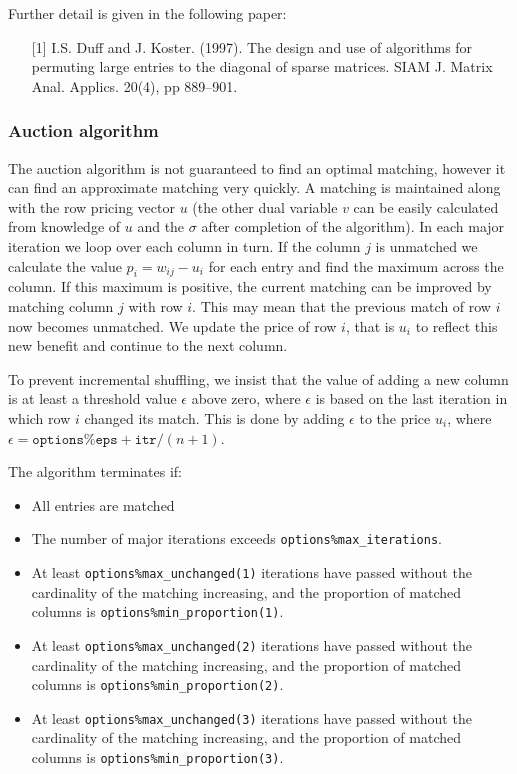 \noindent
Further detail is given in the following paper:
\begin{itemize}
   \item[{[1]}] I.S. Duff and J. Koster. (1997). The design and use of algorithms for permuting large entries to the diagonal of sparse matrices. SIAM J. Matrix Anal. Applics. 20(4), pp 889--901.
\end{itemize}

\subsubsection{Auction algorithm} \label{method:auction}
The auction algorithm is not guaranteed to find an optimal matching, however it
can find an approximate matching very quickly. A matching is maintained along
with the row pricing vector $u$ (the other dual variable $v$ can be easily
calculated from knowledge of $u$ and the $\sigma$ after completion of the
algorithm). In each major iteration we loop over each column in turn. If the
column $j$ is unmatched we calculate the value $p_i = w_{ij} - u_i$ for each
entry and find the maximum across the column. If this maximum is positive, the
current matching can be improved by matching column $j$ with row $i$. This may
mean that the previous match of row $i$ now becomes unmatched. We update the
price of row $i$, that is $u_i$ to reflect this new benefit and continue to the
next column.

To prevent incremental shuffling, we insist that the value of
adding a new column is at least a threshold value $\epsilon$ above zero, where
$\epsilon$ is based on the last iteration in which row $i$ changed its match.
This is done by adding $\epsilon$ to the price $u_i$, where $\epsilon = \texttt{options\%eps} + \texttt{itr} / (n+1)$.

The algorithm terminates if:
\begin{itemize}
   \item All entries are matched
   \item The number of major iterations exceeds \texttt{options\%max\_iterations}.
   \item At least \texttt{options\%max\_unchanged(1)} iterations have passed without the cardinality of the matching increasing, and the proportion of matched columns is \texttt{options\%min\_proportion(1)}.
   \item At least \texttt{options\%max\_unchanged(2)} iterations have passed without the cardinality of the matching increasing, and the proportion of matched columns is \texttt{options\%min\_proportion(2)}.
   \item At least \texttt{options\%max\_unchanged(3)} iterations have passed without the cardinality of the matching increasing, and the proportion of matched columns is \texttt{options\%min\_proportion(3)}.
\end{itemize}

